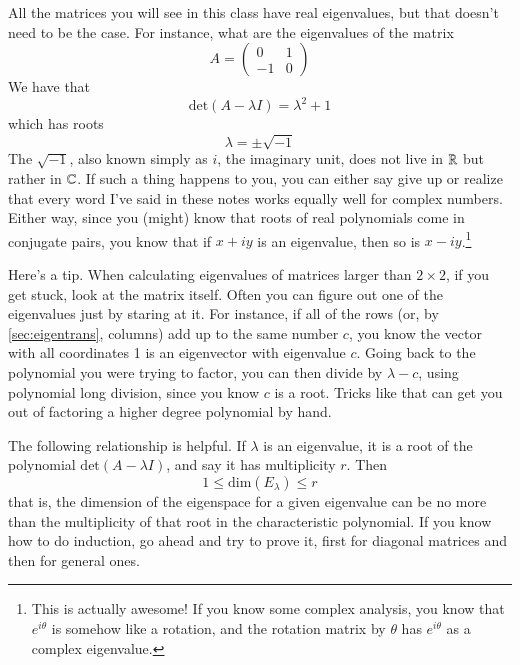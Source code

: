 \documentclass[Main.tex]{subfiles}
\begin{document}
\begin{Warning}
  All the matrices you will see in this class have real eigenvalues, but that doesn't need to be the case.
  For instance, what are the eigenvalues of the matrix
  \[A=\left(\begin{array}{cc} 0 & 1 \\ -1 & 0\end{array}\right)\]
  We have that
  \[\mbox{det}(A-\lambda I) = \lambda^2 + 1\]
  which has roots
  \[\lambda = \pm \sqrt{-1}\]
  The $\sqrt{-1}$, also known simply as $i$, the imaginary unit, does not live in $\mathbb{R}$ but rather in $\mathbb{C}$.
  If such a thing happens to you, you can either say give up or realize that every word I've said in these notes works equally well for complex numbers.
  Either way, since you (might) know that roots of real polynomials come in conjugate pairs, you know that if $x+iy$ is an eigenvalue, then so is $x-iy$.\footnote{This is actually awesome!
  If you know some complex analysis, you know that $e^{i\theta}$ is somehow like a rotation, and the rotation matrix by $\theta$ has $e^{i\theta}$ as a complex eigenvalue.}
\end{Warning}

\begin{Remark}
  Here's a tip.
  When calculating eigenvalues of matrices larger than $2\times 2$, if you get stuck, look at the matrix itself.
  Often you can figure out one of the eigenvalues just by staring at it.
  For instance, if all of the rows (or, by \ref{sec:eigentrans}, columns) add up to the same number $c$, you know the vector with all coordinates 1 is an eigenvector with eigenvalue $c$.
  Going back to the polynomial you were trying to factor, you can then divide by $\lambda - c$, using polynomial long division, since you know $c$ is a root.
  Tricks like that can get you out of factoring a higher degree polynomial by hand.
\end{Remark}

\begin{Remark}
  The following relationship is helpful.  
  If $\lambda$ is an eigenvalue, it is a root of the polynomial $\mbox{det}(A-\lambda I)$, and say it has multiplicity $r$.
  Then 
  \[1 \le \mbox{dim}(E_\lambda) \le r\]
  that is, the dimension of the eigenspace for a given eigenvalue can be no more than the multiplicity of that root in the characteristic polynomial.  
  If you know how to do induction, go ahead and try to prove it, first for diagonal matrices and then for general ones.  
\end{Remark}
\end{document}
